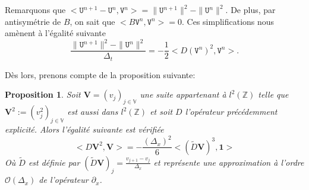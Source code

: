 \documentclass[12pt,a4paper]{article}
\newtheorem{prop}[dfn]{\textbf{Proposition}}
\numberwithin{equation}{section}
\begin{document}
Remarquons que $<\texttt{U}^{n+1} - \texttt{U}^n,\texttt{V}^n> = \|\texttt{U}^{n+1}\|^2-\|\texttt{U}^{n}\|^2$. De plus, par antisymétrie de $B$, on sait que $<B\texttt{V}^n,\texttt{V}^n> = 0$. Ces simplifications nous amènent à l'égalité suivante
\begin{equation*}
    \frac{\|\texttt{U}^{n+1}\|^2-\|\texttt{U}^{n}\|^2}{\Delta_t} = -\frac{1}{2}<D (\texttt{V}^n)^2 ,\texttt{V}^n> .
\end{equation*}

Dès lors, prenons compte de la proposition suivante:
\begin{prop}
    Soit $\textbf{V} = (v_j)_{j\in\mathbb{V}}$ une suite appartenant à $l^2(\mathbb{Z})$ telle que $\textbf{V}^2:=(v_j^2)_{j\in\mathbb{V}}$ est aussi dans $l^2(\mathbb{Z})$ et soit $D$ l'opérateur précédemment explicité. Alors l'égalité suivante est vérifiée
    \begin{equation}
        <D \textbf{V}^2 ,\textbf{V}> = -\frac{(\Delta_x)^2}{6}<(\tilde{D}\textbf{V})^3,\textbf{1}>
    \end{equation}
    Où $\tilde{D}$ est définie par $(\tilde{D}\textbf{V})_j = \frac{v_{j+1}-v_j}{\Delta_x}$ et représente une approximation à l'ordre $\mathcal{O}(\Delta_x)$ de l'opérateur $\partial_x$.
\end{prop}
\end{document}
